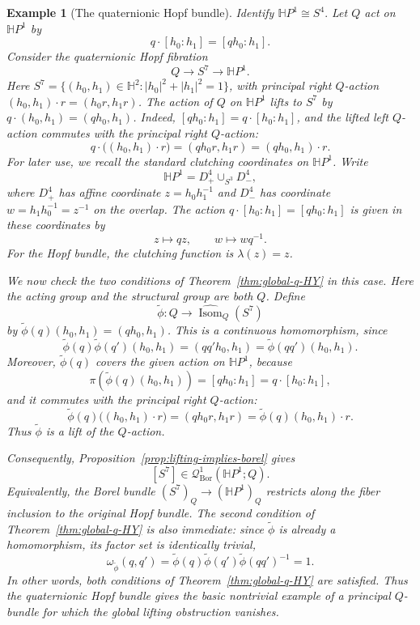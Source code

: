 \documentclass[11pt,a4paper]{article}
\numberwithin{equation}{section}
\newtheorem{example}[definition]{Example}
\theoremstyle{named}
\begin{document}
\begin{example}[The quaternionic Hopf bundle]
\label{ex:quaternionic-hopf-lift}
Identify \(\mathbb H P^1\cong S^4.\) Let \(Q\) act on \(\mathbb H P^1\) by
\[
q\cdot[h_0:h_1]=[qh_0:h_1].
\]
Consider the quaternionic Hopf fibration
\[
Q\longrightarrow S^7\longrightarrow \mathbb H P^1.
\]
Here \(S^7=\{(h_0,h_1)\in\mathbb H^2:|h_0|^2+|h_1|^2=1\}\), with principal right \(Q\)-action \((h_0,h_1)\cdot r=(h_0r,h_1r)\). The action of \(Q\) on \(\mathbb H P^1\) lifts to \(S^7\) by \(q\cdot(h_0,h_1)=(qh_0,h_1)\). Indeed, \([qh_0:h_1]=q\cdot[h_0:h_1]\), and the lifted left \(Q\)-action commutes with the principal right \(Q\)-action:
\[
q\cdot\bigl((h_0,h_1)\cdot r\bigr)=(qh_0r,h_1r) = (qh_0,h_1)\cdot r.
\]
For later use, we recall the standard clutching coordinates on \(\mathbb H P^1\). Write
\[
\mathbb H P^1=D^4_+\cup_{S^3}D^4_-,
\]
where \(D^4_+\) has affine coordinate \(z=h_0h_1^{-1}\) and \(D^4_-\) has coordinate \(w=h_1h_0^{-1}=z^{-1}\) on the overlap. The action \(q\cdot[h_0:h_1]=[qh_0:h_1]\) is given in these coordinates by
\[
z\longmapsto qz,
\qquad
w\longmapsto wq^{-1}.
\]
For the Hopf bundle, the clutching function is \(\lambda(z)=z\). 

We now check the two conditions of Theorem~\ref{thm:global-q-HY} in this case. Here the acting group and the structural group are both \(Q\). Define
\[
\widetilde\phi:Q\longrightarrow \widehat{\operatorname{Isom}}_Q(S^7)
\]
by \(\widetilde\phi(q)(h_0,h_1)=(qh_0,h_1)\). This is a continuous homomorphism, since
\[
\widetilde\phi(q)\widetilde\phi(q')(h_0,h_1) = (qq'h_0,h_1) = \widetilde\phi(qq')(h_0,h_1).
\]
Moreover, \(\widetilde\phi(q)\) covers the given action on \(\mathbb H P^1\), because
\[
\pi(\widetilde\phi(q)(h_0,h_1))=[qh_0:h_1]=q\cdot[h_0:h_1],
\]
and it commutes with the principal right \(Q\)-action:
\[
\widetilde\phi(q)\bigl((h_0,h_1)\cdot r\bigr)=(qh_0r,h_1r)=\widetilde\phi(q)(h_0,h_1)\cdot r.
\]
Thus \(\widetilde\phi\) is a lift of the \(Q\)-action.

Consequently, Proposition~\ref{prop:lifting-implies-borel} gives
\[
[S^7]\in \mathcal Q^1_{\mathrm{Bor}}(\mathbb H P^1;Q).
\]
Equivalently, the Borel bundle
\((S^7)_Q\to(\mathbb H P^1)_Q\) restricts along the fiber inclusion to the original Hopf bundle. The second condition of Theorem~\ref{thm:global-q-HY} is also immediate: since \(\widetilde\phi\) is already a homomorphism, its factor set is identically trivial,
\[
\omega_{\widetilde\phi}(q,q')=\widetilde\phi(q)\widetilde\phi(q')\widetilde\phi(qq')^{-1}=1.
\]
In other words, both conditions of Theorem~\ref{thm:global-q-HY} are satisfied. Thus the quaternionic Hopf bundle gives the basic nontrivial example of a principal \(Q\)-bundle for which the global lifting obstruction vanishes.
\end{example}
\end{document}
